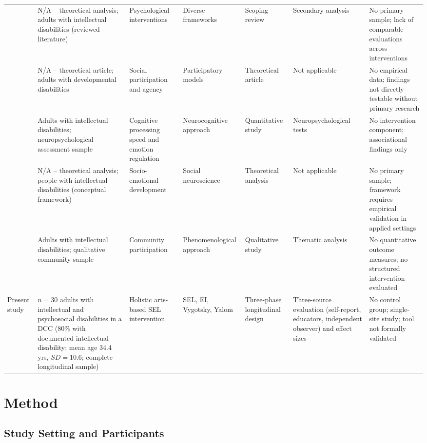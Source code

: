 \documentclass[12pt,a4paper]{article}
\begin{document}
{\begin{landscape}
\begin{longtable}{p{2.5cm} p{3.0cm} p{3.8cm} p{3.0cm} p{2.8cm} p{3.0cm} p{3.8cm}}
\textcite{witwer2022} & N/A -- theoretical analysis; adults with intellectual disabilities (reviewed literature) & Psychological interventions & Diverse frameworks & Scoping review & Secondary analysis & No primary sample; lack of comparable evaluations across interventions \\
\textcite{mcnaughton2025} & N/A -- theoretical article; adults with developmental disabilities & Social participation and agency & Participatory models & Theoretical article & Not applicable & No empirical data; findings not directly testable without primary research \\
\textcite{okafor2025} & Adults with intellectual disabilities; neuropsychological assessment sample & Cognitive processing speed and emotion regulation & Neurocognitive approach & Quantitative study & Neuropsychological tests & No intervention component; associational findings only \\
\textcite{sappok2022} & N/A -- theoretical analysis; people with intellectual disabilities (conceptual framework) & Socio-emotional development & Social neuroscience & Theoretical analysis & Not applicable & No primary sample; framework requires empirical validation in applied settings \\
\textcite{parsakia2024} & Adults with intellectual disabilities; qualitative community sample & Community participation & Phenomenological approach & Qualitative study & Thematic analysis & No quantitative outcome measures; no structured intervention evaluated \\
Present study & $n=30$ adults with intellectual and psychosocial disabilities in a DCC (80\% with documented intellectual disability; mean age 34.4 yrs, $SD=10.6$; complete longitudinal sample) & Holistic arts-based SEL intervention & SEL, EI, Vygotsky, Yalom & Three-phase longitudinal design & Three-source evaluation (self-report, educators, independent observer) and effect sizes & No control group; single-site study; tool not formally validated \\
\end{longtable}
\end{landscape}
}

\section{Method}

\subsection{Study Setting and Participants}
\end{document}
